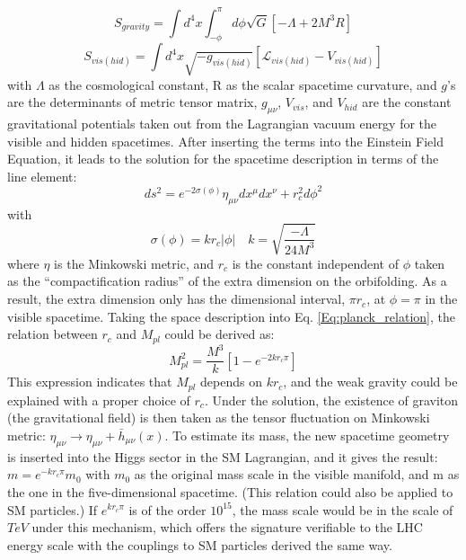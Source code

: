 \begin{equation}
S_{gravity} = \int d^4x \int^{\pi}_{-\phi}d\phi\sqrt{G}\left[-\Lambda +2M^3R\right]
\end{equation}
\begin{equation}
S_{vis(hid)} = \int d^4x\sqrt{-g_{vis(hid)}}\left[\mathcal{L}_{vis(hid)}-V_{vis(hid)}\right]
\end{equation}
with $\Lambda$ as the cosmological constant, R as the scalar spacetime curvature, and $g$'s are the determinants of metric tensor matrix,  $g_{\mu\nu}$, $V_{vis}$, and $V_{hid}$ are the constant gravitational potentials taken out from the Lagrangian vacuum energy for the visible and hidden spacetimes. After inserting the terms into the Einstein Field Equation, it leads to the solution for the spacetime description in terms of the line element:
\begin{equation}
ds^2=e^{-2\sigma(\phi)}\eta_{\mu\nu}dx^\mu dx^\nu + r_c^2 d\phi^2
\end{equation}
with
\begin{equation}
\sigma(\phi) = kr_c|\phi| \quad k=\sqrt{\frac{-\Lambda}{24M^3}}
\end{equation}
where $\eta$ is the Minkowski metric, and $r_{c}$ is the constant independent of $\phi$ taken as the ``compactification radius'' of the extra dimension on the orbifolding. As a result, the extra dimension only has the dimensional interval, $\pi r_{c}$, at $\phi=\pi$ in the visible spacetime. Taking the space description into Eq. \ref{Eq:planck_relation}, the relation between $r_c$ and $M_{pl}$ could be derived as:
\begin{equation}
M_{pl}^2=\frac{M^3}{k}\left[1-e^{-2kr_{c}\pi}\right]
\end{equation}
This expression indicates that $M_{pl}$ depends on $kr_{c}$, and the weak gravity could be explained with a proper choice of $r_c$. Under the solution, the existence of graviton (the gravitational field) is then taken as the tensor fluctuation on Minkowski metric: $\eta_{\mu\nu} \rightarrow \eta_{\mu\nu}+\bar{h}_{\mu\nu}(x)$. To estimate its mass, the new spacetime geometry is inserted into the Higgs sector in the SM Lagrangian, and it gives the result: $m=e^{-kr_{c}\pi}m_{0}$ with $m_{0}$ as the original mass scale in the visible manifold, and m as the one in the five-dimensional spacetime. (This relation could also be applied to SM particles.) If $e^{kr_{c}\pi}$ is of the order $10^{15}$, the mass scale would be in the scale of $TeV$ under this mechanism, which offers the signature verifiable to the LHC energy scale with the couplings to SM particles derived the same way.
